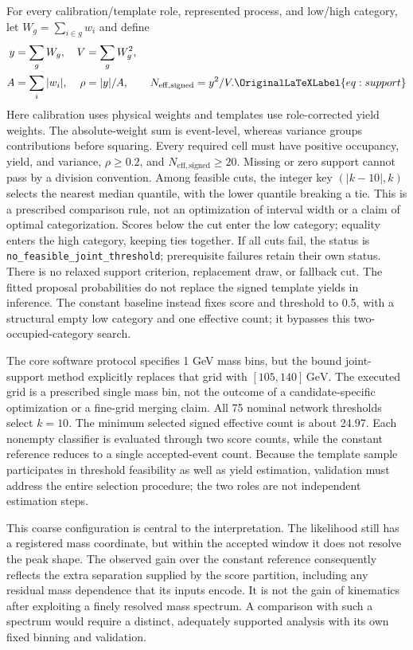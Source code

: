 \documentclass[aps,prd,reprint,superscriptaddress,nofootinbib,longbibliography,floatfix]{revtex4-2}
\let\label\OriginalLaTeXLabel
\newcommand{\GeV}{\,\mathrm{GeV}}
\begin{document}
For every calibration/template role, represented process, and low/high
category, let $W_g=\sum_{i\in g}w_i$ and define
\begin{align}
 y&=\sum_g W_g, & V&=\sum_g W_g^2,\nonumber\\
 A&=\sum_i|w_i|, & \rho&=|y|/A,\qquad
 N_{\mathrm{eff,signed}}=y^2/V.
 \label{eq:support}
\end{align}
Here calibration uses physical weights and templates use role-corrected
yield weights. The absolute-weight sum is event-level, whereas variance
groups contributions before squaring. Every required cell must have positive
occupancy, yield, and variance, $\rho\geq0.2$, and
$N_{\mathrm{eff,signed}}\geq20$. Missing or zero support cannot pass by a
division convention. Among feasible cuts, the integer key $(|k-10|,k)$
selects the nearest median quantile, with the lower quantile breaking a tie.
This is a prescribed comparison rule, not an optimization of interval width
or a claim of optimal categorization. Scores below the cut enter the low
category; equality enters the high category, keeping ties together.
If all cuts fail, the status is \texttt{no\_feasible\_joint\_threshold};
prerequisite failures retain their own status. There is no relaxed support
criterion, replacement draw, or fallback cut. The fitted proposal
probabilities do not replace the signed template yields in inference.
The constant baseline instead fixes score and threshold to 0.5, with a
structural empty low category and one effective count; it bypasses this
two-occupied-category search.

The core software protocol specifies 1 GeV mass bins, but the bound
joint-support method explicitly replaces that grid with $[105,140]\GeV$.
The executed grid is a prescribed single mass bin, not the outcome of a
candidate-specific optimization or a fine-grid merging claim. All 75
nominal network thresholds select $k=10$. The minimum selected signed
effective count is about 24.97. Each nonempty classifier is evaluated
through two score counts, while the constant reference reduces to a single
accepted-event count. Because the template sample participates in threshold
feasibility as well as yield estimation, validation must address the entire
selection procedure; the two roles are not independent estimation steps.

This coarse configuration is central to the interpretation. The likelihood
still has a registered mass coordinate, but within the accepted window it
does not resolve the peak shape. The observed gain over the constant
reference consequently reflects the extra separation supplied by the score
partition, including any residual mass dependence that its inputs encode.
It is not the gain of kinematics after exploiting a finely resolved mass
spectrum. A comparison with such a spectrum would require a distinct,
adequately supported analysis with its own fixed binning and validation.
\end{document}
